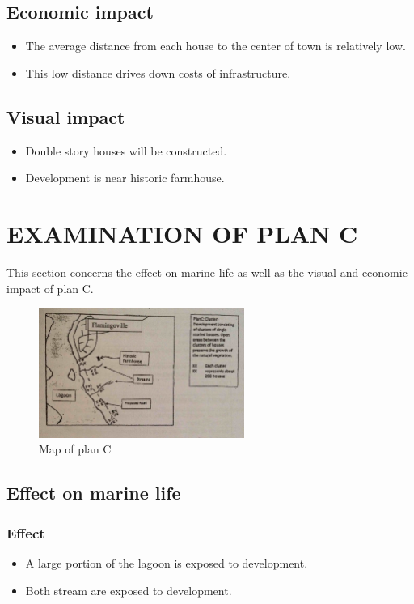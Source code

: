 \documentclass{article}
\begin{document}
\subsection{Economic impact}
\begin{itemize}
	\item The average distance from each house to the center of town is relatively low.
	\item This low distance drives down costs of infrastructure.
\end{itemize}

\subsection{Visual impact}
\begin{itemize}
	\item Double story houses will be constructed.
	\item Development is near historic farmhouse.
\end{itemize}

\newpage
\section{EXAMINATION OF PLAN C}
This section concerns the effect on marine life as well as the visual and economic impact of plan C.

\begin{figure}[h!]
	\centering
	\includegraphics[width=0.6\textwidth]{plan_c}
	\caption{Map of plan C}
\end{figure}

\subsection{Effect on marine life}
\subsubsection{Effect}
\begin{itemize}
	\item A large portion of the lagoon is exposed to development.
	\item Both stream are exposed to development.
\end{itemize}
\end{document}
